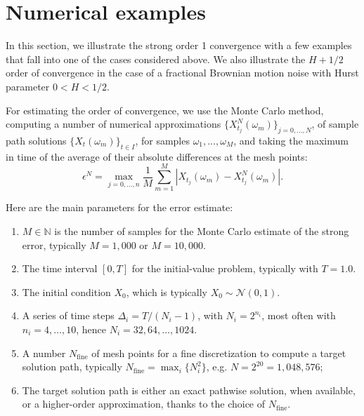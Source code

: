 \documentclass[reqno,12pt]{amsart}
\theoremstyle{plain}%
\theoremstyle{definition}
\begin{document}
\section{Numerical examples}

In this section, we illustrate the strong order 1 convergence with a few examples that fall into one of the cases considered above. We also illustrate the $H+1/2$ order of convergence in the case of a fractional Brownian motion noise with Hurst parameter $0 < H < 1/2$.

For estimating the order of convergence, we use the Monte Carlo method, computing a number of numerical approximations $\{X_{t_j}^N(\omega_m)\}_{j=0, \ldots, N}$, of sample path solutions $\{X_t(\omega_m)\}_{t\in I}$, for samples $\omega_1, \ldots, \omega_M$, and taking the maximum in time of the average of their absolute differences at the mesh points:
\begin{equation}
    \epsilon^N = \max_{j=0, \ldots, n} \frac{1}{M}\sum_{m=1}^M \left|X_{t_j}(\omega_m) - X_{t_j}^N(\omega_m)\right|.
\end{equation}

Here are the main parameters for the error estimate:
\begin{enumerate}
    \item $M\in\mathbb{N}$ is the number of samples for the Monte Carlo estimate of the strong error, typically $M=1,000$ or $M=10,000$.
    \item The time interval $[0, T]$ for the initial-value problem, typically with $T=1.0$.
    \item The initial condition $X_0$, which is typically $X_0 \sim \mathcal{N}(0, 1)$.
    \item A series of time steps $\Delta_i = T/(N_i-1)$, with $N_i=2^{n_i}$, most often with $n_i=4, \ldots, 10$, hence $N_i=32, 64, \ldots, 1024$.
    \item A number $N_{\mathrm{fine}}$ of mesh points for a fine discretization to compute a target solution path, typically $N_{\mathrm{fine}} = \max_i\{N_i^2\}$, e.g. $N=2^{20} = 1,048,576$;
    \item The target solution path is either an exact pathwise solution, when available, or a higher-order approximation, thanks to the choice of $N_{\mathrm{fine}}$.
\end{enumerate}
\end{document}
